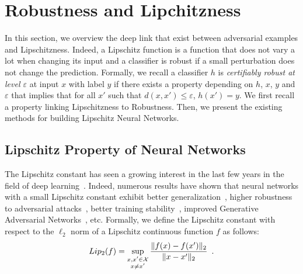 \section{Robustness and Lipchitzness}

In this section, we overview the deep link that exist between adversarial examples and Lipschitzness. Indeed, a Lipschitz function is a function that does not vary a lot when changing its input and a classifier is robust if a small perturbation does not change the prediction. Formally, we recall a classifier $h$ is \emph{certifiably robust at level $\varepsilon$} at input $x$ with label $y$ if there exists a property depending on $h$, $x$, $y$ and $\varepsilon$ that implies that for all $x'$ such that $d(x,x')\leq\varepsilon$, $h(x') = y$. We first recall a property linking  Lipschitzness to Robustness. Then, we present the existing methods for building Lipschitz Neural Networks. 




\subsection{Lipschitz Property of Neural Networks}


The Lipschitz constant has seen a growing interest in the last few years in the field of deep learning~\citep{scaman2018lipschitz,fazlyab2019efficient,combettes2020lipschitz,bethune2021many}.
Indeed, numerous results have shown that neural networks with a small Lipschitz constant exhibit better generalization~\citep{bartlett2017spectrally}, higher robustness to adversarial attacks~\citep{Szegedy2013IntriguingPO,farnia2018generalizable,tsuzuku2018lipschitz}, better training stability~\citep{xiao2018dynamical,trockman2021orthogonalizing}, improved Generative Adversarial Networks~\citep{arjovsky2017wasserstein}, etc.
Formally, we define the Lipschitz constant with respect to the $\ell_2$ norm of a Lipschitz continuous function $f$ as follows:
\begin{equation*}
  Lip_{2}{(f)} = \sup_{\substack{x, x' \in \mathcal{X} \\ x \neq x'}} \frac{\lVert f(x) - f(x') \rVert_2}{\lVert x - x' \rVert_2} \enspace.
\end{equation*}

